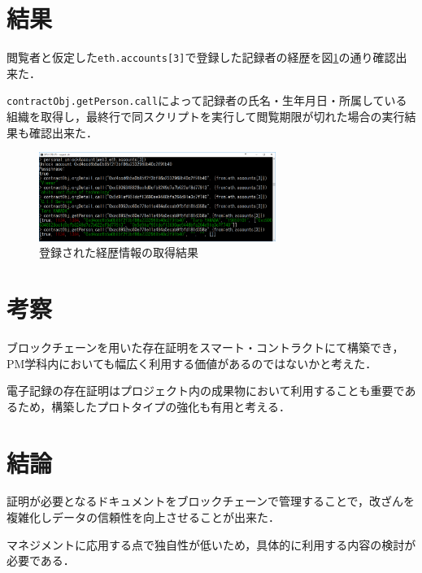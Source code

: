 \documentclass[uplatex,twocolumn,dvipdfmx]{jsarticle}
\begin{document}
\section{結果}

閲覧者と仮定した\verb|eth.accounts[3]|で登録した記録者の経歴を図\ref{code}の通り確認出来た．

\verb|contractObj.getPerson.call|によって記録者の氏名・生年月日・所属している組織を取得し，最終行で同スクリプトを実行して閲覧期限が切れた場合の実行結果も確認出来た．

\begin{figure}[htb]
\centering
\includegraphics[width=7.7cm,clip]{code.png}
\caption{登録された経歴情報の取得結果}\label{code}
\end{figure}

\section{考察}

ブロックチェーンを用いた存在証明をスマート・コントラクトにて構築でき，PM学科内においても幅広く利用する価値があるのではないかと考えた．

電子記録の存在証明はプロジェクト内の成果物において利用することも重要であるため，構築したプロトタイプの強化も有用と考える．

\section{結論}

証明が必要となるドキュメントをブロックチェーンで管理することで，改ざんを複雑化しデータの信頼性を向上させることが出来た．

マネジメントに応用する点で独自性が低いため，具体的に利用する内容の検討が必要である．


\end{document}
